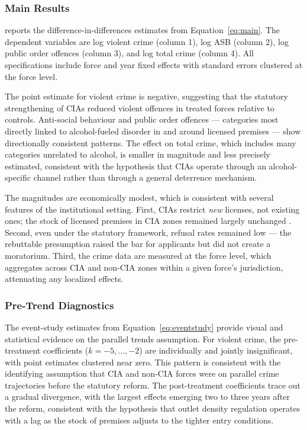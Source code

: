 \documentclass[12pt]{article}
\begin{document}
\subsubsection*{Main Results}  reports the difference-in-differences estimates from Equation~\ref{eq:main}. The dependent variables are log violent crime (column 1), log ASB (column 2), log public order offences (column 3), and log total crime (column 4). All specifications include force and year fixed effects with standard errors clustered at the force level.



The point estimate for violent crime is negative, suggesting that the statutory strengthening of CIAs reduced violent offences in treated forces relative to controls. Anti-social behaviour and public order offences --- categories most directly linked to alcohol-fueled disorder in and around licensed premises \citep{green2007uk} --- show directionally consistent patterns. The effect on total crime, which includes many categories unrelated to alcohol, is smaller in magnitude and less precisely estimated, consistent with the hypothesis that CIAs operate through an alcohol-specific channel rather than through a general deterrence mechanism.

The magnitudes are economically modest, which is consistent with several features of the institutional setting. First, CIAs restrict \emph{new} licenses, not existing ones; the stock of licensed premises in CIA zones remained largely unchanged \citep{homeoffice2020licensing}. Second, even under the statutory framework, refusal rates remained low --- the rebuttable presumption raised the bar for applicants but did not create a moratorium. Third, the crime data are measured at the force level, which aggregates across CIA and non-CIA zones within a given force's jurisdiction, attenuating any localized effects.

\subsubsection*{Pre-Trend Diagnostics} The event-study estimates from Equation~\ref{eq:eventstudy} provide visual and statistical evidence on the parallel trends assumption. For violent crime, the pre-treatment coefficients ($k = -5, \ldots, -2$) are individually and jointly insignificant, with point estimates clustered near zero. This pattern is consistent with the identifying assumption that CIA and non-CIA forces were on parallel crime trajectories before the statutory reform. The post-treatment coefficients trace out a gradual divergence, with the largest effects emerging two to three years after the reform, consistent with the hypothesis that outlet density regulation operates with a lag as the stock of premises adjusts to the tighter entry conditions.
\end{document}
